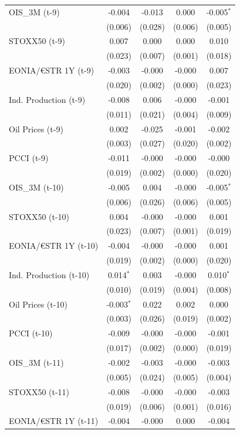 \begin{longtable}[t]{lcccc}
OIS\_3M (t-9) & -0.004 & -0.013 & 0.000 & -0.005$^{*}$\\
 & (0.006) & (0.028) & (0.006) & (0.005)\\
STOXX50 (t-9) & 0.007 & 0.000 & 0.000 & 0.010\\
 & (0.023) & (0.007) & (0.001) & (0.018)\\
EONIA/€STR 1Y (t-9) & -0.003 & -0.000 & -0.000 & 0.007\\
 & (0.020) & (0.002) & (0.000) & (0.023)\\
Ind. Production (t-9) & -0.008 & 0.006 & -0.000 & -0.001\\
 & (0.011) & (0.021) & (0.004) & (0.009)\\
Oil Prices (t-9) & 0.002 & -0.025 & -0.001 & -0.002\\
 & (0.003) & (0.027) & (0.020) & (0.002)\\
PCCI (t-9) & -0.011 & -0.000 & -0.000 & -0.000\\
 & (0.019) & (0.002) & (0.000) & \vphantom{1} (0.020)\\
OIS\_3M (t-10) & -0.005 & 0.004 & -0.000 & -0.005$^{*}$\\
 & (0.006) & (0.026) & (0.006) & (0.005)\\
STOXX50 (t-10) & 0.004 & -0.000 & -0.000 & 0.001\\
 & (0.023) & (0.007) & (0.001) & (0.019)\\
EONIA/€STR 1Y (t-10) & -0.004 & -0.000 & -0.000 & 0.001\\
 & (0.019) & (0.002) & (0.000) & (0.020)\\
Ind. Production (t-10) & 0.014$^{*}$ & 0.003 & -0.000 & 0.010$^{*}$\\
 & (0.010) & (0.019) & (0.004) & (0.008)\\
Oil Prices (t-10) & -0.003$^{*}$ & 0.022 & 0.002 & 0.000\\
 & (0.003) & (0.026) & (0.019) & (0.002)\\
PCCI (t-10) & -0.009 & -0.000 & -0.000 & -0.001\\
 & (0.017) & (0.002) & (0.000) & \vphantom{1} (0.019)\\
OIS\_3M (t-11) & -0.002 & -0.003 & -0.000 & -0.003\\
 & (0.005) & (0.024) & (0.005) & (0.004)\\
STOXX50 (t-11) & -0.008 & -0.000 & -0.000 & -0.003\\
 & (0.019) & (0.006) & (0.001) & (0.016)\\
EONIA/€STR 1Y (t-11) & -0.004 & -0.000 & 0.000 & -0.004\\

\end{longtable}
